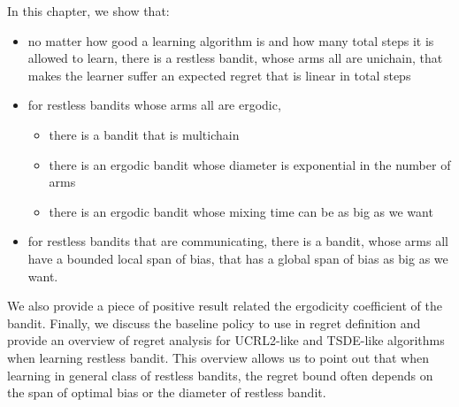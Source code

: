 

In this chapter, we show that:
\begin{itemize}
    \item no matter how good a learning algorithm is and how many total steps it is allowed to learn, there is a restless bandit, whose arms all are unichain, that makes the learner suffer an expected regret that is linear in total steps
    \item for restless bandits whose arms all are ergodic,
        \begin{itemize}
            \item there is a bandit that is multichain
            \item there is an ergodic bandit whose diameter is exponential in the number of arms
            \item there is an ergodic bandit whose mixing time can be as big as we want
        \end{itemize}
    \item for restless bandits that are communicating, there is a bandit, whose arms all have a bounded local span of bias, that has a global span of bias as big as we want.
\end{itemize}
We also provide a piece of positive result related the ergodicity coefficient of the bandit.
Finally, we discuss the baseline policy to use in regret definition and provide an overview of regret analysis for UCRL2-like and TSDE-like algorithms when learning restless bandit.
This overview allows us to point out that when learning in general class of restless bandits, the regret bound often depends on the span of optimal bias or the diameter of restless bandit.



